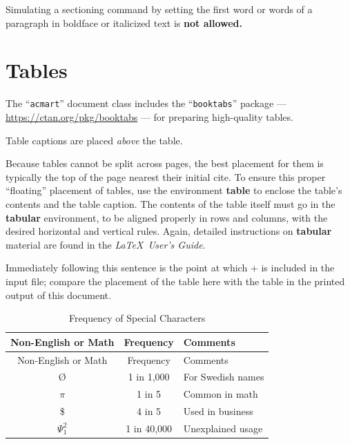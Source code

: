 \documentclass[
acmsmall,
nonacm,
screen,
acmthm]{../templates/acmart}
\makeatletter
\newcounter{tableno}
\newenvironment{tablenos:no-prefix-table-caption}{
  \caption@ifcompatibility{}{
    \let\oldthetable\thetable
    \let\oldtheHtable\theHtable
    \renewcommand{\thetable}{tableno:\thetableno}
    \renewcommand{\theHtable}{tableno:\thetableno}
    \stepcounter{tableno}
    \captionsetup{labelformat=empty}
  }
}{
  \caption@ifcompatibility{}{
    \captionsetup{labelformat=default}
    \let\thetable\oldthetable
    \let\theHtable\oldtheHtable
    \addtocounter{table}{-1}
  }
}
\makeatother
\begin{document}
Simulating a sectioning command by setting the first word or words of a
paragraph in boldface or italicized text is \textbf{not allowed.}

\hypertarget{tables}{%
\section{Tables}\label{tables}}

The ``\texttt{acmart}'' document class includes the
``\texttt{booktabs}'' package --- \url{https://ctan.org/pkg/booktabs}
--- for preparing high-quality tables.

Table captions are placed \emph{above} the table.

Because tables cannot be split across pages, the best placement for them
is typically the top of the page nearest their initial cite. To ensure
this proper ``floating'' placement of tables, use the environment
\textbf{table} to enclose the table's contents and the table caption.
The contents of the table itself must go in the \textbf{tabular}
environment, to be aligned properly in rows and columns, with the
desired horizontal and vertical rules. Again, detailed instructions on
\textbf{tabular} material are found in the \emph{LaTeX~User's Guide}.

Immediately following this sentence is the point at which
+\citet{tab:freq} is included in the input file; compare the placement
of the table here with the table in the printed output of this document.

\hypertarget{tab:freq}{}
\begin{tablenos:no-prefix-table-caption}

\begin{longtable}[]{@{}ccl@{}}
\caption{Frequency of Special Characters}\tabularnewline
\toprule
Non-English or Math & Frequency & Comments \\
\midrule
\endfirsthead
\toprule
Non-English or Math & Frequency & Comments \\
\midrule
\endhead
Ø & 1 in 1,000 & For Swedish names \\
\(\pi\) & 1 in 5 & Common in math \\
\$ & 4 in 5 & Used in business \\
\(\Psi^2_1\) & 1 in 40,000 & Unexplained usage \\
\bottomrule
\end{longtable}

\end{tablenos:no-prefix-table-caption}
\end{document}
